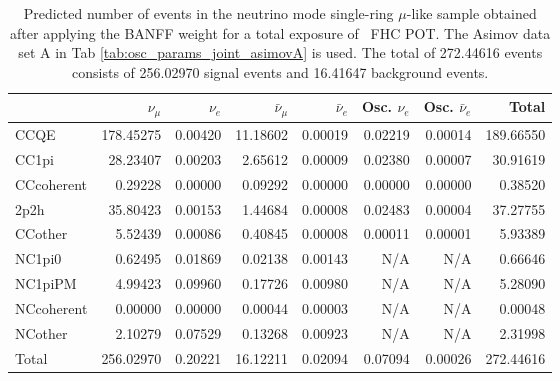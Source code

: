 \begin{table}
	\centering
	\begin{tabular} { | l ||r | r | r | r | r | r | | r | }
	\hline
	              & $\nu_\mu$            & $\nu_e$              & $\bar{\nu}_{\mu}$    & $\bar{\nu}_{e}$      & Osc. $\nu_e$         & Osc. $\bar{\nu}_{e}$ & Total                \\ \hline\hline
	 CCQE         & 178.45275            & 0.00420              & 11.18602             & 0.00019              & 0.02219              & 0.00014              & 189.66550            \\ \hline
	 CC1pi        & 28.23407             & 0.00203              & 2.65612              & 0.00009              & 0.02380              & 0.00007              & 30.91619             \\ \hline
	 CCcoherent   & 0.29228              & 0.00000              & 0.09292              & 0.00000              & 0.00000              & 0.00000              & 0.38520              \\ \hline
	 2p2h         & 35.80423             & 0.00153              & 1.44684              & 0.00008              & 0.02483              & 0.00004              & 37.27755             \\ \hline
	 CCother      & 5.52439              & 0.00086              & 0.40845              & 0.00008              & 0.00011              & 0.00001              & 5.93389              \\ \hline
	 NC1pi0       & 0.62495              & 0.01869              & 0.02138              & 0.00143              & N/A                  & N/A                  & 0.66646              \\ \hline
	 NC1piPM      & 4.99423              & 0.09960              & 0.17726              & 0.00980              & N/A                  & N/A                  & 5.28090              \\ \hline
	 NCcoherent   & 0.00000              & 0.00000              & 0.00044              & 0.00003              & N/A                  & N/A                  & 0.00048              \\ \hline
	 NCother      & 2.10279              & 0.07529              & 0.13268              & 0.00923              & N/A                  & N/A                  & 2.31998              \\ \hline
	\hline
	 Total        & 256.02970            & 0.20221              & 16.12211             & 0.02094              & 0.07094              & 0.00026              & 272.44616            \\ \hline
	\end{tabular}
	\caption{Predicted number of events in the neutrino mode single-ring $\mu$-like sample obtained after applying the BANFF weight for a total exposure of \TotalPotNuRunOneNine\ FHC POT. The Asimov data set A in Tab \ref{tab:osc_params_joint_asimovA} is used. The total of 272.44616 events consists of 256.02970 signal events and 16.41647 background events.}
\label{tab:event_rates_exp_1Rmu_R1-9d}
\end{table}

